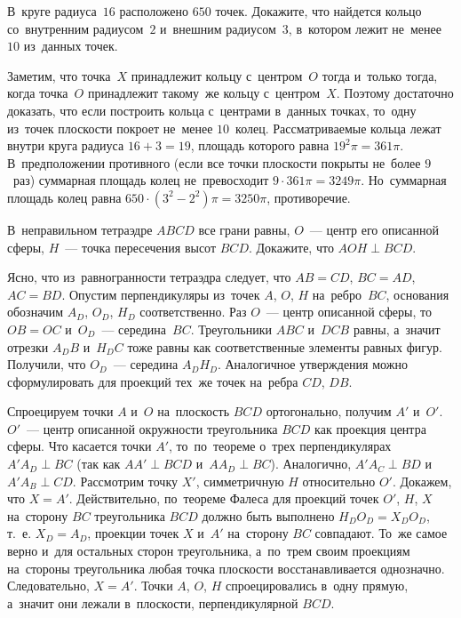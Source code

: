 \begin{problems}

\item
В~круге радиуса~$16$ расположено $650$ точек.
Докажите, что найдется кольцо со~внутренним радиусом~$2$ и~внешним
радиусом~$3$, в~котором лежит не~менее $10$ из~данных точек.

\end{problems}

\ifincludesolutions
Заметим, что точка~$X$ принадлежит кольцу с~центром~$O$ тогда и~только тогда,
когда точка~$O$ принадлежит такому~же кольцу с~центром~$X$.
Поэтому достаточно доказать, что если построить кольца с~центрами в~данных
точках, то~одну из~точек плоскости покроет не~менее $10$~колец.
Рассматриваемые кольца лежат внутри круга радиуса $16 + 3 = 19$, площадь
которого равна $19^2 \pi = 361 \pi$.
В~предположении противного (если все точки плоскости покрыты не~более $9$~раз)
суммарная площадь колец не~превосходит $9 \cdot 361 \pi = 3249 \pi$.
Но~суммарная площадь колец равна $650 \cdot (3^2 - 2^2) \pi = 3250 \pi$,
противоречие.
\fi %

\begin{problems}

\item
В~неправильном тетраэдре $ABCD$ все грани равны, $O$~--- центр его описанной
сферы, $H$~--- точка пересечения высот $BCD$.
Докажите, что $AOH \perp BCD$.

\end{problems}

\ifincludesolutions
Ясно, что из~равногранности тетраэдра следует, что $AB = CD$, $BC = AD$,
$AC = BD$.
Опустим перпендикуляры из~точек $A$, $O$, $H$ на~ребро~$BC$, основания
обозначим $A_D$, $O_D$, $H_D$ соответственно.
Раз $O$~--- центр описанной сферы, то~$OB = OC$ и~$O_D$~--- середина~$BC$.
Треугольники $ABC$ и~$DCB$ равны, а~значит отрезки $A_D B$ и~$H_D C$ тоже равны
как соответственные элементы равных фигур.
Получили, что $O_D$~--- середина $A_D H_D$.
Аналогичное утверждения можно сформулировать для проекций тех~же точек
на~ребра $CD$, $DB$.
\par
Спроецируем точки $A$ и~$O$ на~плоскость $BCD$ ортогонально, получим
$A'$ и~$O'$.
$O'$~--- центр описанной окружности треугольника $BCD$ как проекция центра
сферы.
Что касается точки $A'$, то~по~теореме о~трех перпендикулярах $A' A_D \perp BC$
(так как $AA' \perp BCD$ и~$A A_D \perp BC$).
Аналогично, $A' A_C \perp BD$ и~$A' A_B \perp CD$.
Рассмотрим точку $X'$, симметричную $H$ относительно $O'$.
Докажем, что $X = A'$.
Действительно, по~теореме Фалеса для проекций точек $O'$, $H$, $X$ на~сторону
$BC$ треугольника $BCD$ должно быть выполнено $H_DO_D = X_DO_D$, т.~е.
$X_D = A_D$, проекции точек $X$ и~$A'$ на~сторону $BC$ совпадают.
То~же самое верно и~для остальных сторон треугольника, а~по~трем своим
проекциям на~стороны треугольника любая точка плоскости восстанавливается
однозначно.
Следовательно, $X = A'$.
Точки $A$, $O$, $H$ спроецировались в~одну прямую, а~значит они лежали в~плоскости, перпендикулярной $BCD$.
\fi %

